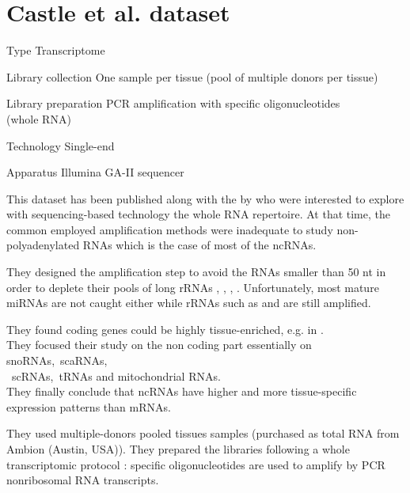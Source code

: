 \chapter{Castle et al. dataset}
\label{ch:castleData}

\begin{eqlist}
    \item[Type] Transcriptome
    \item[Library collection] One sample per tissue (pool of multiple donors per tissue)
    \item[Library preparation] \gls{PCR} amplification with specific oligonucleotides\\(whole RNA)
    \item[Technology] Single-end
    \item[Apparatus] Illumina GA-II sequencer
\end{eqlist}

This dataset has been published along with the 
    by \citet*{castleData} who were interested to explore
    with sequencing-based technology the whole RNA repertoire. At that time, the common
    employed amplification methods were inadequate to study non-polyadenylated
    \glspl{RNA} which is the case of most of the \glspl{ncRNA}.

    They designed the amplification step to avoid the \glspl{RNA}
    smaller than 50 \gls{nt} in order to deplete their pools of long
    \glspl{rRNA} , , ,
    . Unfortunately, most mature \glspl{miRNA} are not caught
    either while \glspl{rRNA} such as  and  are
    still amplified.

    They found coding genes could be highly tissue-enriched, e.g. 
    in .\\They focused their study on the non coding part essentially
    on \glspl{snoRNA},~\glspl{scaRNA},\\~\glspl{scRNA},~\glspl{tRNA} and mitochondrial
    \glspl{RNA}.\\
    They finally conclude that \glspl{ncRNA} have higher and more tissue-specific
    expression patterns than \glspl{mRNA}.

    They used multiple-donors pooled tissues samples (purchased as total \gls{RNA}
    from Ambion (Austin, USA)).
    They prepared the libraries following a whole transcriptomic protocol \citep{Armour:2009}:
    specific oligonucleotides are used to amplify by \gls{PCR} nonribosomal \gls{RNA}
    transcripts.

